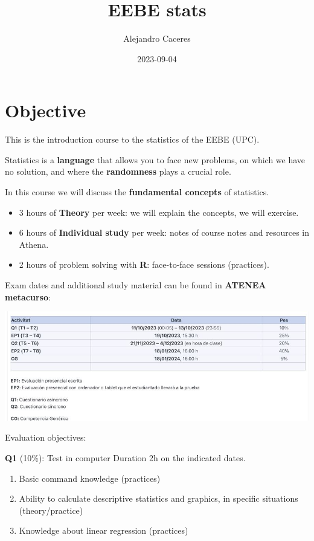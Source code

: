 \documentclass[
]{book}
\title{EEBE stats}
\author{Alejandro Caceres}
\date{2023-09-04}
\providecommand{\tightlist}{%
  \setlength{\itemsep}{0pt}\setlength{\parskip}{0pt}}
\begin{document}
\maketitle

{
\setcounter{tocdepth}{1}
\tableofcontents
}
\hypertarget{objective}{%
\chapter{Objective}\label{objective}}

This is the introduction course to the statistics of the EEBE (UPC).

Statistics is a \textbf{language} that allows you to face new problems, on which we have no solution, and where the \textbf{randomness} plays a crucial role.

In this course we will discuss the \textbf{fundamental concepts} of statistics.

\begin{itemize}
\item
  3 hours of \textbf{Theory} per week: we will explain the concepts, we will exercise.
\item
  6 hours of \textbf{Individual study} per week: notes of course notes and resources in Athena.
\item
  2 hours of problem solving with \textbf{R}: face-to-face sessions (practices).
\end{itemize}

Exam dates and additional study material can be found in \textbf{ATENEA metacurso}:

\includegraphics{./figures/notas.JPG}

Evaluation objectives:

\textbf{Q1} (10\%): Test in computer Duration 2h on the indicated dates.

\begin{enumerate}
\def\labelenumi{\alph{enumi}.}
\tightlist
\item
  Basic command knowledge (practices)
\item
  Ability to calculate descriptive statistics and graphics, in specific situations (theory/practice)
\item
  Knowledge about linear regression (practices)
\end{enumerate}
\end{document}
